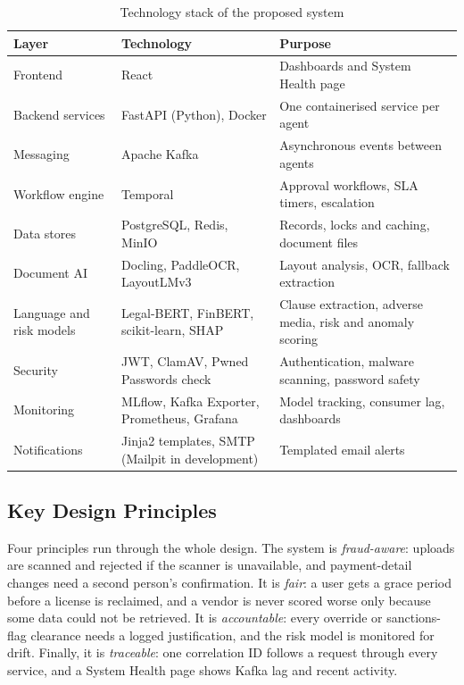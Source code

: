 \begin{table}[!htbp]
\centering
\footnotesize
\renewcommand{\arraystretch}{1.2}
\caption{Technology stack of the proposed system}
\label{tab:stack}
\begin{tabular}{|p{}|p{}|p{}|}
\hline
\raggedright \textbf{Layer} & \raggedright \textbf{Technology} & \raggedright \textbf{Purpose} \tabularnewline \hline
\raggedright Frontend & \raggedright React & \raggedright Dashboards and System Health page \tabularnewline \hline
\raggedright Backend services & \raggedright FastAPI (Python), Docker & \raggedright One containerised service per agent \tabularnewline \hline
\raggedright Messaging & \raggedright Apache Kafka & \raggedright Asynchronous events between agents \tabularnewline \hline
\raggedright Workflow engine & \raggedright Temporal & \raggedright Approval workflows, SLA timers, escalation \tabularnewline \hline
\raggedright Data stores & \raggedright PostgreSQL, Redis, MinIO & \raggedright Records, locks and caching, document files \tabularnewline \hline
\raggedright Document AI & \raggedright Docling, PaddleOCR, LayoutLMv3 & \raggedright Layout analysis, OCR, fallback extraction \tabularnewline \hline
\raggedright Language and risk models & \raggedright Legal-BERT, FinBERT, scikit-learn, SHAP & \raggedright Clause extraction, adverse media, risk and anomaly scoring \tabularnewline \hline
\raggedright Security & \raggedright JWT, ClamAV, Pwned Passwords check & \raggedright Authentication, malware scanning, password safety \tabularnewline \hline
\raggedright Monitoring & \raggedright MLflow, Kafka Exporter, Prometheus, Grafana & \raggedright Model tracking, consumer lag, dashboards \tabularnewline \hline
\raggedright Notifications & \raggedright Jinja2 templates, SMTP (Mailpit in development) & \raggedright Templated email alerts \tabularnewline \hline
\end{tabular}
\end{table}

\subsection{Key Design Principles}

Four principles run through the whole design. The system is \emph{fraud-aware}: uploads are scanned and rejected if the scanner is unavailable, and payment-detail changes need a second person's confirmation. It is \emph{fair}: a user gets a grace period before a license is reclaimed, and a vendor is never scored worse only because some data could not be retrieved. It is \emph{accountable}: every override or sanctions-flag clearance needs a logged justification, and the risk model is monitored for drift. Finally, it is \emph{traceable}: one correlation ID follows a request through every service, and a System Health page shows Kafka lag and recent activity.

